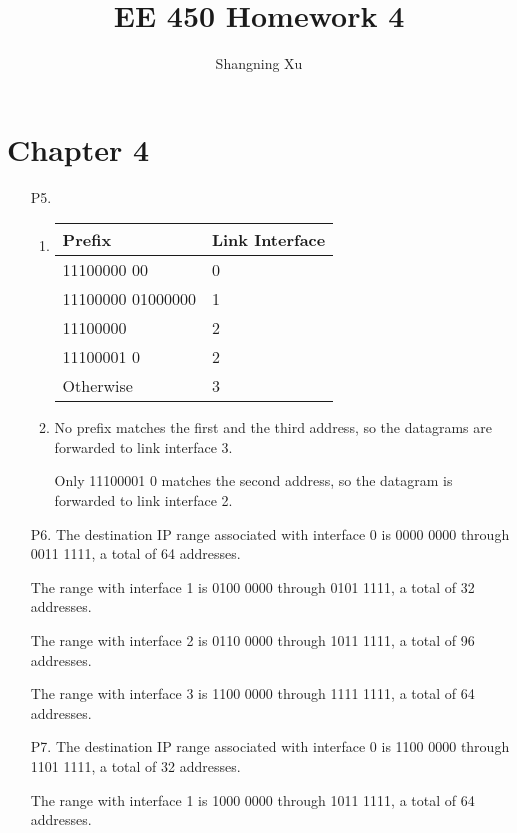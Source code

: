 \documentclass{article}
\title{EE 450 Homework 4}
\author{Shangning Xu}
\begin{document}
\maketitle

\section*{Chapter 4}

\begin{enumerate}
    \item[P5.] \begin{enumerate}
        \item \begin{tabular}{@{}ll@{}}
            \toprule
            Prefix            & Link Interface \\ \midrule
            11100000 00       & 0              \\
            11100000 01000000 & 1              \\
            11100000          & 2              \\
            11100001 0        & 2              \\
            Otherwise         & 3              \\ \bottomrule
        \end{tabular}
        \item No prefix matches the first and the third address, so the datagrams are forwarded to link interface 3.
        
        Only 11100001 0 matches the second address, so the datagram is forwarded to link interface 2.
    \end{enumerate}

    \item[P6.] The destination IP range associated with interface 0 is 0000 0000 through 0011 1111, a total of 64 addresses.

    The range with interface 1 is 0100 0000 through 0101 1111, a total of 32 addresses.

    The range with interface 2 is 0110 0000 through 1011 1111, a total of 96 addresses.

    The range with interface 3 is 1100 0000 through 1111 1111, a total of 64 addresses.
    
    \item[P7.] The destination IP range associated with interface 0 is 1100 0000 through 1101 1111, a total of 32 addresses.
    
    The range with interface 1 is 1000 0000 through 1011 1111, a total of 64 addresses.


\end{enumerate}
\end{document}
